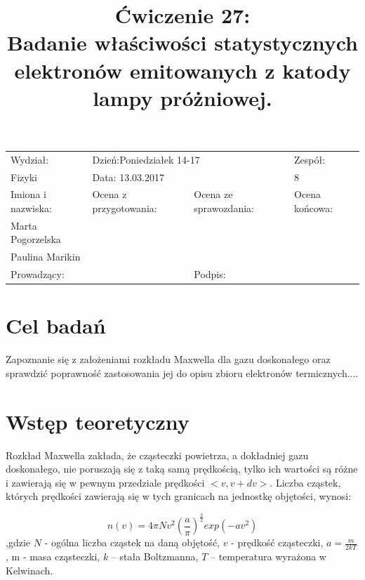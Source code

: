 \documentclass[a4paper,10pt]{article}
\def\arraystretch{1.2}
\begin{document}
\begin{table}
  \centering
  \def\arraystretch{1.5}
    \begin{tabular}{|l|l|l|l|} \hline
    Wydział:           & \multicolumn{2}{l|}{Dzień:Poniedziałek 14-17}    &Zespół:  \\
    Fizyki             &    \multicolumn{2}{l|}{Data: 13.03.2017}         &8             \\\hline
    Imiona i nazwiska: &Ocena z przygotowania:  &Ocena ze sprawozdania:   &Ocena końcowa: \\
    Marta Pogorzelska  &                        &                         &                \\
    Paulina Marikin    &                        &                         &\\\hline
    \multicolumn{2}{|l|}{Prowadzący:                 } &\multicolumn{2}{l|}{Podpis:             }  \\\hline
  \end{tabular}
\end{table}

\title{Ćwiczenie 27:\\Badanie właściwości statystycznych elektronów emitowanych z katody lampy próżniowej.}
\date{}
\maketitle{}

\section{Cel badań}
Zapoznanie się  z założeniami rozkładu Maxwella dla gazu doskonałego oraz sprawdzić poprawność zastosowania jej do opisu zbioru elektronów termicznych....

\section{Wstęp teoretyczny}
Rozkład Maxwella zakłada, że cząsteczki powietrza, a dokładniej gazu doskonałego, nie poruszają się z taką samą prędkością, tylko ich  wartości są różne i zawierają się w pewnym przedziale prędkości $<v, v + dv>$. Liczba cząstek, których prędkości zawierają się w tych granicach na jednostkę objętości, wynosi:

\begin{equation}
n(v) = 4\pi Nv^2(\frac{a}{\pi})^{\frac{3}{2}}exp(-av^2)
\end{equation}
,gdzie  $N$ - ogólna liczba cząstek na daną objętość, $v$ - prędkość cząsteczki, $a = \frac{m}{2kT}$, m - masa cząsteczki, $k$ – stała Boltzmanna, $T$ – temperatura wyrażona w Kelwinach.
\vspace{0,4cm}
\end{document}
